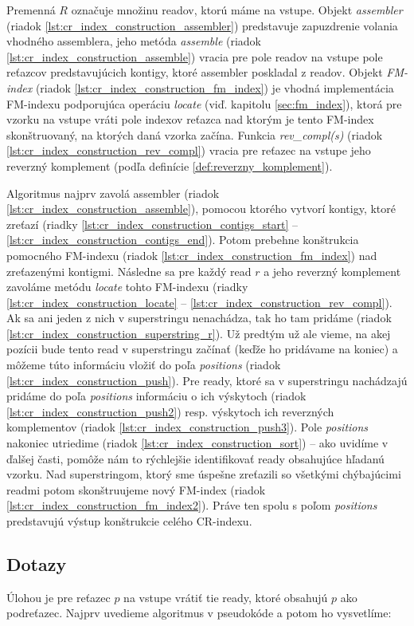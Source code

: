 Premenná $R$ označuje množinu readov, ktorú máme na vstupe. Objekt \emph{assembler} (riadok \ref{lst:cr_index_construction_assembler}) predstavuje zapuzdrenie volania vhodného assemblera, jeho metóda \emph{assemble} (riadok \ref{lst:cr_index_construction_assemble}) vracia pre pole readov na vstupe pole reťazcov predstavujúcich kontigy, ktoré assembler poskladal z readov. Objekt \emph{FM-index} (riadok \ref{lst:cr_index_construction_fm_index}) je vhodná implementácia FM-indexu podporujúca operáciu \emph{locate} (viď. kapitolu \ref{sec:fm_index}), ktorá pre vzorku na vstupe vráti pole indexov reťazca nad ktorým je tento FM-index skonštruovaný, na ktorých daná vzorka začína. Funkcia \emph{rev\_compl(s)} (riadok \ref{lst:cr_index_construction_rev_compl}) vracia pre reťazec na vstupe jeho reverzný komplement (podľa definície \ref{def:reverzny_komplement}).

Algoritmus najprv zavolá assembler (riadok \ref{lst:cr_index_construction_assemble}), pomocou ktorého vytvorí kontigy, ktoré zreťazí (riadky \ref{lst:cr_index_construction_contigs_start} -- \ref{lst:cr_index_construction_contigs_end}). Potom prebehne konštrukcia pomocného FM-indexu (riadok \ref{lst:cr_index_construction_fm_index}) nad zreťazenými kontigmi. Následne sa pre každý read $r$ a jeho reverzný komplement zavoláme metódu \emph{locate} tohto FM-indexu (riadky \ref{lst:cr_index_construction_locate} -- \ref{lst:cr_index_construction_rev_compl}). Ak sa ani jeden z nich v superstringu nenachádza, tak ho tam pridáme (riadok \ref{lst:cr_index_construction_superstring_r}). Už predtým už ale vieme, na akej pozícii bude tento read v superstringu začínať (keďže ho pridávame na koniec) a môžeme túto informáciu vložiť do poľa \emph{positions} (riadok \ref{lst:cr_index_construction_push}). Pre ready, ktoré sa v superstringu nachádzajú pridáme do poľa \emph{positions} informáciu o ich výskytoch (riadok \ref{lst:cr_index_construction_push2}) resp. výskytoch ich reverzných komplementov (riadok \ref{lst:cr_index_construction_push3}). Pole \emph{positions} nakoniec utriedime (riadok \ref{lst:cr_index_construction_sort}) -- ako uvidíme v ďalšej časti, pomôže nám to rýchlejšie identifikovať ready obsahujúce hľadanú vzorku. Nad superstringom, ktorý sme úspešne zreťazili so všetkými chýbajúcimi readmi potom skonštruujeme nový FM-index (riadok \ref{lst:cr_index_construction_fm_index2}). Práve ten spolu s poľom \emph{positions} predstavujú výstup konštrukcie celého CR-indexu.

\subsection{Dotazy}
Úlohou je pre reťazec $p$ na vstupe vrátiť tie ready, ktoré obsahujú $p$ ako podreťazec. Najprv uvedieme algoritmus v pseudokóde a potom ho vysvetlíme:

